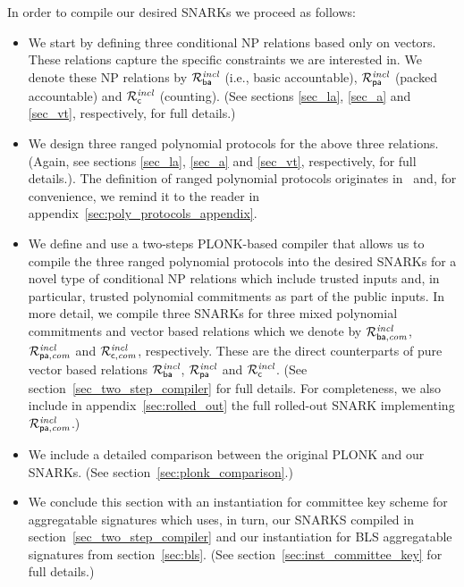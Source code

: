\noindent In order to compile our desired SNARKs we proceed as follows:
\begin{itemize}
\item We start by defining three conditional NP relations based only on vectors. These relations capture the specific constraints we are interested in. 
We denote these NP relations by $\mathcal{R}^{\mathit{incl}}_{\mathsf{ba}}$ (i.e., basic accountable), 
$\mathcal{R}^{\mathit{incl}}_{\mathsf{pa}}$ (packed accountable) and $\mathcal{R}^{\mathit{incl}}_{\mathsf{c}}$ (counting). 
(See sections \ref{sec_la}, \ref{sec_a} and \ref{sec_vt}, respectively, for full details.) 
\item We design three ranged polynomial protocols for the above three relations. (Again, see sections \ref{sec_la}, \ref{sec_a} and \ref{sec_vt}, 
respectively, for full details.). The definition of ranged polynomial protocols originates in~\cite{plonk} and, for convenience, we remind it to the reader 
in appendix~\ref{sec:poly_protocols_appendix}.  
\item We define and use a two-steps PLONK-based compiler that allows us to compile the three ranged polynomial protocols into the desired 
SNARKs for a novel type of conditional NP relations which include trusted inputs and, in particular, trusted polynomial commitments as part of the 
public inputs. In more detail, we compile three SNARKs for three mixed polynomial commitments and vector based relations which we denote by 
$\mathcal{R}^{\mathit{incl}}_{\mathsf{ba},\mathit{com}}$, $\mathcal{R}^{\mathit{incl}}_{\mathsf{pa},\mathit{com}}$ and $\mathcal{R}^{\mathit{incl}}_{\mathsf{c},\mathit{com}}$, respectively. These are the direct counterparts of pure vector based relations 
$\mathcal{R}^{\mathit{incl}}_{\mathsf{ba}}$, $\mathcal{R}^{\mathit{incl}}_{\mathsf{pa}}$ and $\mathcal{R}^{\mathit{incl}}_{\mathsf{c}}$. 
(See section~\ref{sec_two_step_compiler} for full details. For completeness, we also include in appendix~\ref{sec:rolled_out} the full rolled-out 
SNARK implementing $\mathcal{R}^{\mathit{incl}}_{\mathsf{pa},\mathit{com}}$.) 
\item We include a detailed comparison between the original PLONK and our SNARKs. 
(See section~\ref{sec:plonk_comparison}.) 
\item We conclude this section with an instantiation for committee key scheme for aggregatable signatures which uses, in turn, our SNARKS compiled in section~\ref{sec_two_step_compiler} 
and our instantiation for BLS aggregatable signatures from section~\ref{sec:bls}. (See section~\ref{sec:inst_committee_key} for full details.)
\end{itemize}

